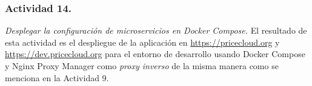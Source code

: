 \subsubsection{Actividad 14.}
\emph{Desplegar la configuración de microservicios en \gls{Docker Compose}.} El resultado de esta actividad es el despliegue de la aplicación en \url{https://pricecloud.org} y \url{https://dev.pricecloud.org} para el entorno de desarrollo usando \gls{Docker Compose} y \gls{Nginx Proxy Manager} como \emph{proxy inverso} de la misma manera como se menciona en la Actividad 9.
\newline\newline


